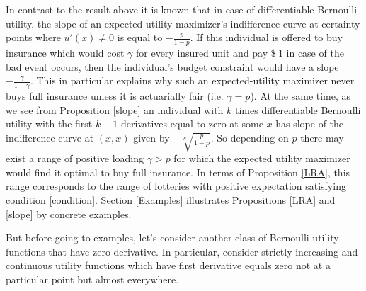 \documentclass[a4paper]{article}
\begin{document}
In contrast to the result above it is known that in case of differentiable Bernoulli utility, the slope of an expected-utility maximizer's indifference curve at certainty points where $u'(x) \neq 0$ is equal to $-\frac{p}{1-p}$. If this individual is offered to buy insurance which would cost $\gamma$ for every insured unit and pay $\$\ 1$ in case of the bad event occurs, then the individual's budget constraint would have a slope $-\frac{\gamma}{1-\gamma}$. This in particular explains why such an expected-utility maximizer never buys full insurance unless it is actuarially fair (i.e. $\gamma = p$). At the same time, as we see from Proposition \ref{slope} an individual with $k$ times differentiable Bernoulli utility with the first $k-1$ derivatives equal to zero at some $x$ has slope of the indifference curve at $(x, x)$ given by $-\sqrt[k]{\frac{p}{1-p}}$. So depending on $p$ there may exist a range of positive loading $\gamma > p$ for which the expected utility maximizer would find it optimal to buy full insurance. In terms of Proposition \ref{LRA}, this range corresponds to the range of lotteries with positive expectation satisfying condition \eqref{condition}. Section \ref{Examples} illustrates Propositions \ref{LRA} and \ref{slope} by concrete examples.


But before going to examples, let's consider another class of Bernoulli utility functions that have zero derivative. In particular, consider strictly increasing and continuous utility functions which have first derivative equals zero not at a particular point but almost everywhere.
\end{document}
